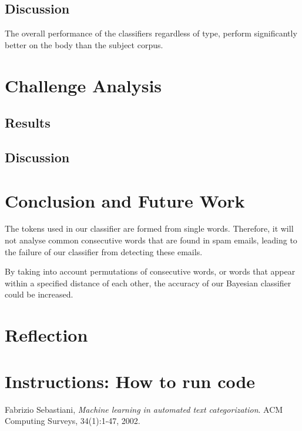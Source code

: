 \documentclass[10pt, a4paper]{article}
\begin{document}
\subsection{Discussion}

%

The overall performance of the classifiers regardless of type, perform significantly better on the body than the subject corpus.

\section{Challenge Analysis}


\subsection{Results}

\subsection{Discussion}

\section{Conclusion and Future Work}

The tokens used in our classifier are formed from single words. Therefore, it will not analyse common consecutive words that are found in spam emails, leading to the failure of our classifier from detecting these emails.

By taking into account permutations of consecutive words, or words that appear within a specified distance of each other, the accuracy of our Bayesian classifier could be increased.

\section{Reflection}

\section{Instructions: How to run code}

\begin{thebibliography}{9}

  Fabrizio Sebastiani,
  \emph{Machine learning in automated text categorization}.
  ACM Computing Surveys,
  34(1):1-47,
  2002.

\end{thebibliography}
\end{document}
